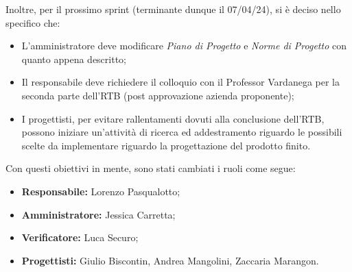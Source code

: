 \noindent Inoltre, per il prossimo sprint (terminante dunque il 07/04/24), si è deciso nello specifico che:
\begin{itemize}
    \item L'amministratore deve modificare \textit{Piano di Progetto} e \textit{Norme di Progetto} con quanto appena descritto;
    \item Il responsabile deve richiedere il colloquio con il Professor Vardanega per la seconda parte dell'RTB (post approvazione azienda proponente);
    \item I progettisti, per evitare rallentamenti dovuti alla conclusione dell'RTB, possono iniziare un'attività di ricerca ed addestramento riguardo le possibili scelte 
    da implementare riguardo la progettazione del prodotto finito.
\end{itemize}
Con questi obiettivi in mente, sono stati cambiati i ruoli come segue:
\begin{itemize}
    \item \textbf{Responsabile:} Lorenzo Pasqualotto;
    \item \textbf{Amministratore:} Jessica Carretta;
    \item \textbf{Verificatore:} Luca Securo;
    \item \textbf{Progettisti:} Giulio Biscontin, Andrea Mangolini, Zaccaria Marangon.
\end{itemize}